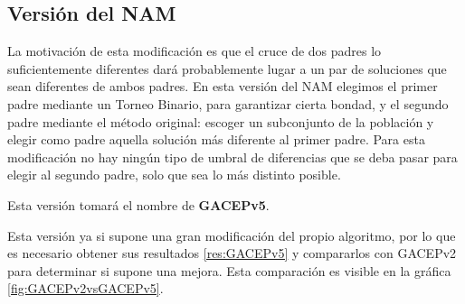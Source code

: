 \subsection{Versión del NAM}

La motivación de esta modificación es que el cruce de dos padres lo suficientemente diferentes dará probablemente lugar a un par de soluciones que sean diferentes de ambos padres. 
En esta versión del NAM elegimos el primer padre mediante un Torneo Binario, para garantizar cierta bondad, y el segundo padre mediante el método original: escoger un subconjunto de la población y elegir como padre aquella solución más diferente al primer padre. 
Para esta modificación no hay ningún tipo de umbral de diferencias que se deba pasar para elegir al segundo padre, solo que sea lo más distinto posible. 

Esta versión tomará el nombre de \textbf{GACEPv5}. 

Esta versión ya si supone una gran modificación del propio algoritmo, por lo que es necesario obtener sus resultados \ref{res:GACEPv5} y compararlos con GACEPv2 para determinar si supone una mejora. 
Esta comparación es visible en la gráfica \ref{fig:GACEPv2vsGACEPv5}.

